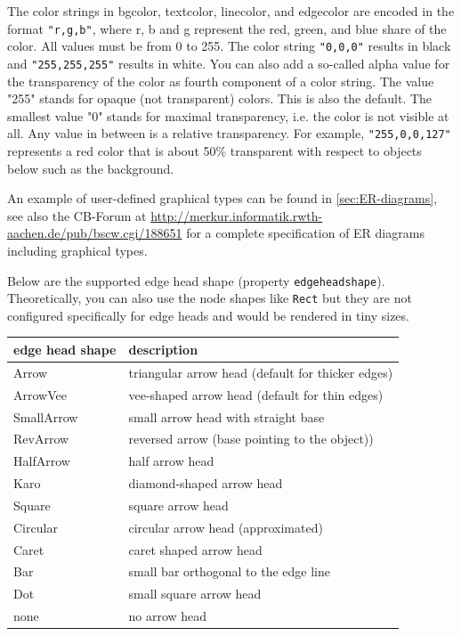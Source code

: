 The color strings in bgcolor, textcolor, linecolor, and edgecolor
are encoded in the format {\tt "r,g,b"}, where r, b and g represent the red,
green, and blue share of the color. All values must be from 0 to 255. The
color string {\tt "0,0,0"} results in black and {\tt "255,255,255"} results in white.
You can also add a so-called alpha value for the transparency of the color as fourth
component of a color string. The value "255" stands for opaque (not transparent) colors.
This is also the default. The smallest value "0" stands for maximal transparency, i.e.
the color is not visible at all. Any value in between is a relative transparency.
For example, {\tt "255,0,0,127"} represents a red color that is about 50\% transparent
with respect to objects below such as the background. 


An example of user-defined graphical types can be found in \ref{sec:ER-diagrams},
see also the CB-Forum at
\url{http://merkur.informatik.rwth-aachen.de/pub/bscw.cgi/188651}
for a complete specification of ER diagrams including graphical types.

Below are the supported edge head shape (property {\tt edgeheadshape}). Theoretically,
you can also use the node shapes like {\tt Rect} but they are not configured
specifically for edge heads and would be rendered in tiny sizes.
\vspace{0.2cm}

\begin{tabular}{|p{4cm}|p{8
cm}|}
\hline
{\bf edge head shape} & {\bf description} \\ \hline \hline
Arrow & triangular arrow head (default for thicker edges) \\ \hline
ArrowVee & vee-shaped arrow head (default for thin edges) \\ \hline
SmallArrow & small arrow head with straight base \\ \hline
RevArrow & reversed arrow (base pointing to the object)) \\ \hline
HalfArrow & half arrow head \\ \hline
Karo & diamond-shaped arrow head  \\ \hline
Square & square arrow head  \\ \hline
Circular & circular arrow head (approximated)  \\ \hline
Caret & caret shaped arrow head \\ \hline
Bar & small bar orthogonal to the edge line \\ \hline
Dot & small square arrow head \\ \hline
none & no arrow head \\ \hline
\end{tabular}

